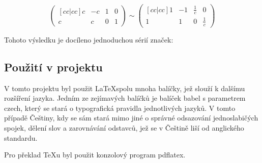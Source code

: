 \documentclass[main.tex]{subfiles}
\begin{document}
$$
\begin{pmatrix}[cc|cc]
	c & -c & 1 & 0 \\
	c & c & 0 & 1 
\end{pmatrix}
\sim
\begin{pmatrix}[cc|cc]
	1 & -1 & \frac{1}{c} & 0 \\
	1 & 1 & 0 & \frac{1}{c} 
\end{pmatrix}
$$

Tohoto výsledku je docíleno jednoduchou sérií značek: %

\subsection{Použití v projektu}
V tomto projektu byl použit \LaTeX spolu mnoha balíčky, jež slouží k dalšímu rozšíření jazyka. Jedním ze zejímavých balíčků je balíček babel s parametrem czech, který se stará o typografická pravidla jednotlivých jazyků. V tomto případě Češtiny, kdy se sám stará mimo jiné o správné odsazování jednoslabičých spojek, dělení slov a zarovnávání odstavců, jež se v Češtině liší od anglického standardu. 

Pro překlad TeXu byl použit konzolový program pdflatex.
\end{document}
